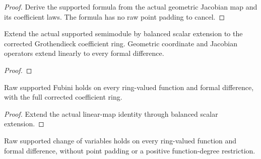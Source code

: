 \begin{proof}


\leanok

Derive the supported formula from the actual geometric Jacobian map and its coefficient laws. The formula has no raw point padding to cancel.

\end{proof}

\begin{definition}

\label{s7-ring}


\leanok

Extend the actual supported semimodule by balanced scalar extension to the corrected Grothendieck coefficient ring. Geometric coordinate and Jacobian operators extend linearly to every formal difference.

\end{definition}

\begin{proof}


\leanok



\end{proof}

\begin{proposition}

\label{s7-11-ring}


\leanok

Raw supported Fubini holds on every ring-valued function and formal difference, with the full corrected coefficient ring.

\end{proposition}

\begin{proof}


\leanok

Extend the actual linear-map identity through balanced scalar extension.

\end{proof}

\begin{proposition}

\label{s7-12-ring}


\leanok

Raw supported change of variables holds on every ring-valued function and formal difference, without point padding or a positive function-degree restriction.

\end{proposition}

